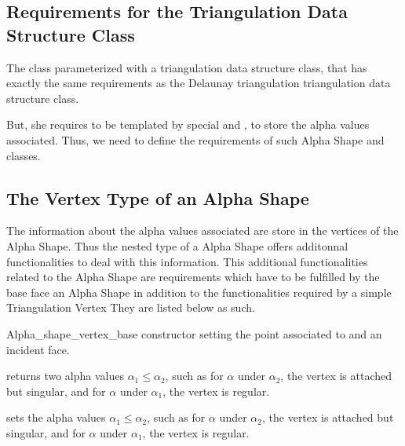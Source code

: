 \subsection{Requirements for the Triangulation Data Structure Class}

The class  parameterized with a
triangulation data structure class, that has exactly the same
requirements as the Delaunay triangulation triangulation data
structure class. 

But, she requires to be templated by special  and
, to store the alpha values associated. Thus, we need to
define the requirements of such Alpha Shape  and
 classes.

\subsection{The Vertex Type of an Alpha Shape\label{I1_SectVertex}}

The information about the alpha values associated  are store in the 
vertices of the Alpha Shape. Thus the nested 
type of a Alpha Shape offers additonnal functionalities to deal with this information.
This additional functionalities related to the Alpha Shape
are requirements which have to be fulfilled
by the base face  an Alpha Shape
in addition to the functionalities required by a simple Triangulation Vertex
They are listed below as such.



\begin{ccClass}{Alpha_shape_vertex_base}
\ccCreation
{}
\ccGlue
{}
\ccGlue
{} 
{constructor setting the point  associated to and an incident face.}

{returns two alpha values $\alpha_1 \leq \alpha_2$, such as for
$\alpha$ under $\alpha_2$, the vertex is attached but singular, and
for $\alpha$ under $\alpha_1$, the vertex is regular.}


\ccModifiers
{}
{sets the alpha values $\alpha_1 \leq \alpha_2$, such as for
$\alpha$ under $\alpha_2$, the vertex is attached but singular, and
for $\alpha$ under $\alpha_1$, the vertex is regular.}
\end{ccClass}


